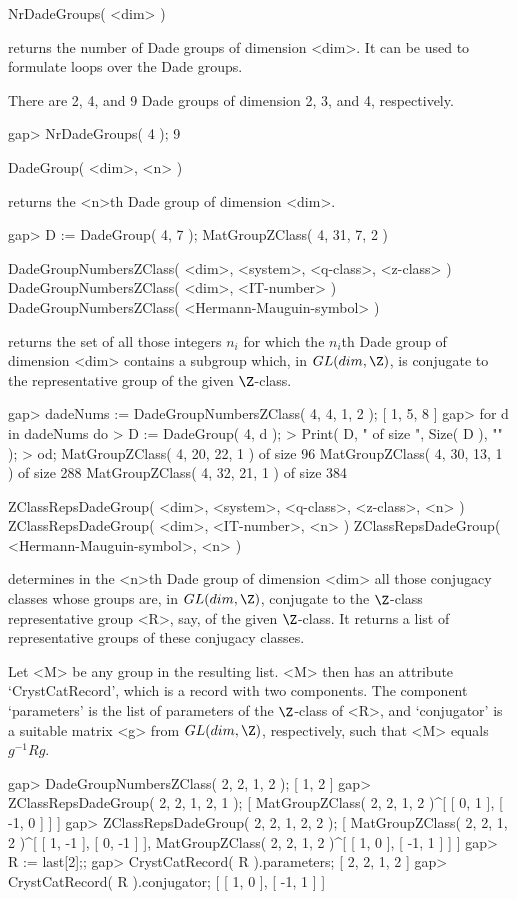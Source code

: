 \>NrDadeGroups( <dim> )

returns the number of Dade groups of dimension <dim>. It can be used
to formulate loops over the Dade groups.

There are 2, 4, and 9 Dade groups of dimension 2, 3, and 4, respectively.

\beginexample
gap> NrDadeGroups( 4 );
9
\endexample

\>DadeGroup( <dim>, <n> )

returns the <n>th Dade group of dimension <dim>.

\beginexample
gap> D := DadeGroup( 4, 7 );
MatGroupZClass( 4, 31, 7, 2 )
\endexample

\>DadeGroupNumbersZClass( <dim>, <system>, <q-class>, <z-class> )
\>DadeGroupNumbersZClass( <dim>, <IT-number> )
\>DadeGroupNumbersZClass( <Hermann-Mauguin-symbol> )

returns the set of all those integers $n_i$ for which the $n_i$th Dade
group of dimension <dim> contains a subgroup which, in $GL(dim,\Z)$,
is conjugate to the representative group of the given $\Z$-class.

\beginexample
gap> dadeNums := DadeGroupNumbersZClass( 4, 4, 1, 2 );
[ 1, 5, 8 ]
gap> for d in dadeNums do
>     D := DadeGroup( 4, d );
>     Print( D, " of size ", Size( D ), "\n" );
> od;
MatGroupZClass( 4, 20, 22, 1 ) of size 96
MatGroupZClass( 4, 30, 13, 1 ) of size 288
MatGroupZClass( 4, 32, 21, 1 ) of size 384
\endexample

\>ZClassRepsDadeGroup( <dim>, <system>, <q-class>, <z-class>, <n> )
\>ZClassRepsDadeGroup( <dim>, <IT-number>, <n> )
\>ZClassRepsDadeGroup( <Hermann-Mauguin-symbol>, <n> )

determines in the <n>th Dade group of dimension <dim> all those
conjugacy classes whose groups are, in $GL(dim,\Z)$, conjugate to the
$\Z$-class representative group <R>, say, of the given $\Z$-class.  It
returns a list of representative groups of these conjugacy classes.

Let <M> be any group in the resulting list.  <M> then has an attribute
`CrystCatRecord', which is a record with two components. The
component `parameters' is the list of parameters of the $\Z$-class of
<R>, and `conjugator' is a suitable matrix <g> from $GL(dim,\Z)$,
respectively, such that <M> equals $g^{-1} R g$.

\beginexample
gap> DadeGroupNumbersZClass( 2, 2, 1, 2 );
[ 1, 2 ]
gap> ZClassRepsDadeGroup( 2, 2, 1, 2, 1 );
[ MatGroupZClass( 2, 2, 1, 2 )^[ [ 0, 1 ], [ -1, 0 ] ] ]
gap> ZClassRepsDadeGroup( 2, 2, 1, 2, 2 );
[ MatGroupZClass( 2, 2, 1, 2 )^[ [ 1, -1 ], [ 0, -1 ] ], 
  MatGroupZClass( 2, 2, 1, 2 )^[ [ 1, 0 ], [ -1, 1 ] ] ]
gap> R := last[2];;
gap> CrystCatRecord( R ).parameters;
[ 2, 2, 1, 2 ]
gap> CrystCatRecord( R ).conjugator;
[ [ 1, 0 ], [ -1, 1 ] ]
\endexample

